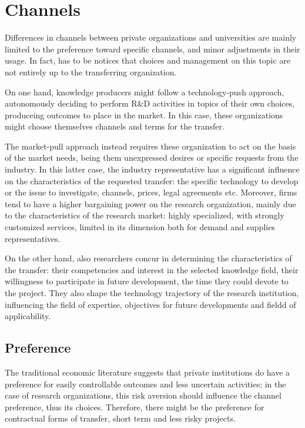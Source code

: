 \section{Channels}

Differences in channels between private organizations and universities are mainly limited to the preference toward specific channels, and minor adjustments in their usage. In fact, has to be notices that choices and management on this topic are not entirely up to the transferring organization. 

On one hand, knowledge producers might follow a technology-push approach, autonomously deciding to perform R\&D activities in topics of their own choices, produceing outcomes to place in the market. In this case, these organizations might choose themselves channels and terms for the transfer.

The market-pull approach instead requires these organization to act on the basis of the market needs, being them unexpressed desires or specific requests from the industry. In this latter case, the industry representative has a significant influence on the characteristics of the requested transfer: the specific technology to develop or the issue to investigate, channels, prices, legal agreements etc. Moreover, firms tend to have a higher bargaining power on the research organization, mainly due to the characteristics of the research market: highly specialized, with strongly customized services, limited in its dimension both for demand and supplies representatives.

On the other hand, also researchers concur in determining the characteristics of the transfer: their competencies and interest in the selected knowledge field, their willingness to participate in future development, the time they could devote to the project. They also shape the technology trajectory of the research institution, influencing the field of expertise, objectives for future developments and fieldd of applicability.

\subsection{Preference}

The traditional economic literature suggests that private institutions do have a preference for easily controllable outcomes and less uncertain activities; in the case of research organizations, this risk aversion should influence the channel preference, thus its choices. Therefore, there might be the preference for contractual forms of transfer, short term and less risky projects.

